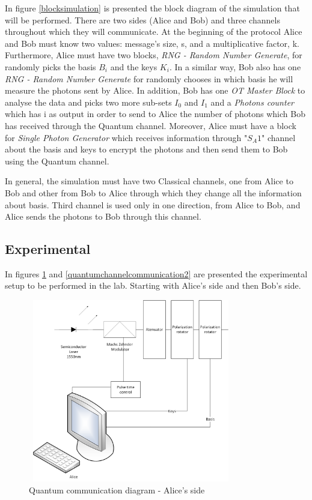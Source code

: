 In figure \ref{blocksimulation} is presented the block diagram of the simulation that will be performed. There are two sides (Alice and Bob) and three channels throughout which they will communicate. 
At the beginning of the protocol Alice and Bob must know two values: message's size, s, and a multiplicative factor, k.
Furthermore, Alice must have two blocks, \textit{RNG - Random Number Generate}, for randomly picks the basis $B_{i}$ and the keys $K_{i}$. In a similar way, Bob also has one \textit{RNG - Random Number Generate} for randomly chooses in which basis he will measure the photons sent by Alice. In addition, Bob has one \textit{OT Master Block} to analyse the data and picks two more sub-sets $I_{0}$ and $I_{1}$ and a \textit{Photons counter} which has i as output in order to send to Alice the number of photons which Bob has received through the Quantum channel. 
Moreover, Alice must have a block for \textit{Single Photon Generator} which receives information through "$S_A1$" channel about the basis and keys to encrypt the photons and then send them to Bob using the Quantum channel.

In general, the simulation must have two Classical channels, one from Alice to Bob and other from Bob to Alice through which they change all the information about basis. Third channel is used only in one direction, from Alice to Bob, and Alice sends the photons to Bob through this channel.

\subsection{Experimental}
In figures \ref{quantumchannelcommunication1} and \ref{quantumchannelcommunication2} are presented the experimental setup to be performed in the lab. Starting with Alice's side and then Bob's side.

\begin{figure}[H]
	\centering \includegraphics[width=0.8\textwidth,height=8cm]{./sdf/ot_with_discrete_variables/figures/OT_experimental_alice.png}
	\caption{Quantum communication diagram - Alice's side}\label{quantumchannelcommunication1}
\end{figure}

